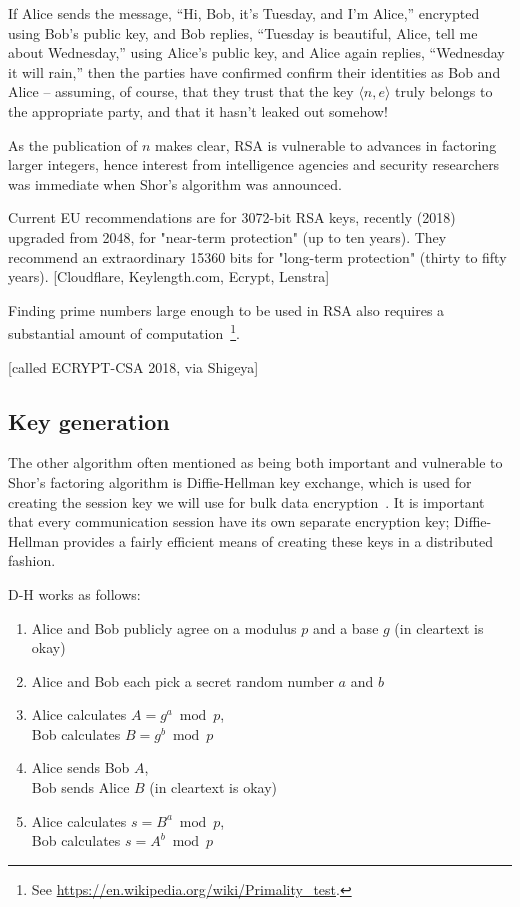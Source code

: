 If Alice sends the message, ``Hi, Bob, it's Tuesday, and I'm Alice,''
encrypted using Bob's public key, and Bob replies, ``Tuesday is
beautiful, Alice, tell me about Wednesday,'' using Alice's public key,
and Alice again replies, ``Wednesday it will rain,'' then the parties
have confirmed confirm their identities as Bob and Alice -- assuming,
of course, that they trust that the key $\langle n,e\rangle$ truly
belongs to the appropriate party, and that it hasn't leaked out
somehow!

As the publication of $n$ makes clear, RSA is vulnerable to advances
in factoring larger integers, hence interest from intelligence
agencies and security researchers was immediate when Shor's algorithm
was announced.

Current EU recommendations are for 3072-bit RSA keys, recently (2018)
upgraded from 2048, for "near-term protection" (up to ten years).
They recommend an extraordinary 15360 bits for "long-term protection"
(thirty to fifty years). [Cloudflare, Keylength.com, Ecrypt, Lenstra]

Finding prime numbers large enough to be used in RSA also requires a
substantial amount of computation~\footnote{See
  \url{https://en.wikipedia.org/wiki/Primality_test}.}.

[called ECRYPT-CSA 2018, via Shigeya]

\subsection{Key generation}

The other algorithm often mentioned as being both important and
vulnerable to Shor's factoring algorithm is Diffie-Hellman key
exchange, which is used for creating the session key we will use for
bulk data encryption~\cite{diffie1976new}.  It is important that every
communication session have its own separate encryption key;
Diffie-Hellman provides a fairly efficient means of creating these
keys in a distributed fashion.

D-H works as follows:

\begin{enumerate}
  \item Alice and Bob publicly agree on a modulus $p$ and a base $g$ (in cleartext is okay)
  \item Alice and Bob each pick a secret random number $a$ and $b$
  \item Alice calculates $A = g^a \bmod p$, \\
    Bob calculates $B = g^b \bmod p$
  \item Alice sends Bob $A$, \\
Bob sends Alice $B$ (in cleartext is okay)
  \item Alice calculates $s = B^a \bmod p$, \\
	   Bob calculates $s = A^b \bmod p$
\end{enumerate}

